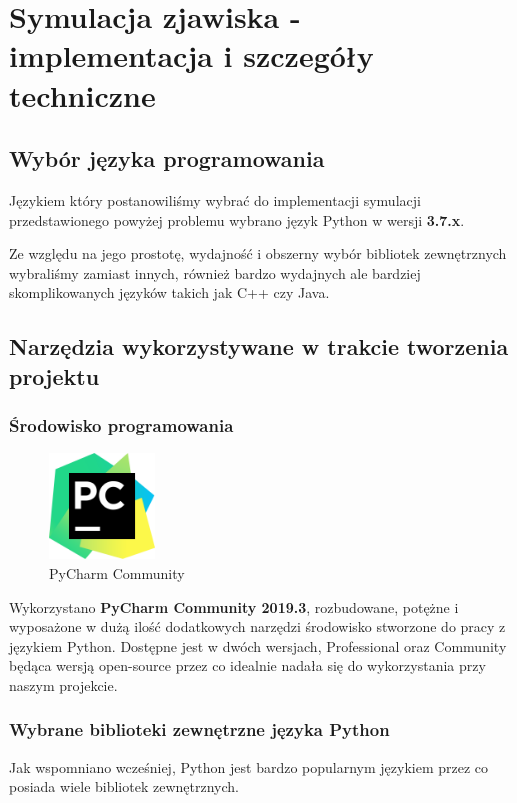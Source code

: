 \chapter{Symulacja zjawiska - implementacja i szczegóły techniczne}

\section{Wybór języka programowania}

Językiem który postanowiliśmy wybrać do implementacji symulacji przedstawionego powyżej problemu wybrano język Python w wersji \textbf{3.7.x}.

Ze względu na jego prostotę, wydajność i obszerny wybór bibliotek zewnętrznych wybraliśmy zamiast innych, również bardzo wydajnych ale bardziej skomplikowanych języków takich jak C++ czy Java.


\section{Narzędzia wykorzystywane w trakcie tworzenia projektu}
\begingroup
\subsection{Środowisko programowania}
\begin{figure}

	\centering
	\includegraphics[width=0.25\textwidth]{PyCharm_Logo.png}
	\caption{\label{fig:frog2}PyCharm Community}

\end{figure}

Wykorzystano \textbf{PyCharm Community 2019.3}, rozbudowane, potężne i wyposażone w dużą ilość dodatkowych narzędzi środowisko stworzone do pracy z językiem Python. Dostępne jest w dwóch wersjach, Professional oraz Community będąca wersją open-source przez co idealnie nadała się do wykorzystania przy naszym projekcie.

\endgroup
\clearpage

\subsection{Wybrane biblioteki zewnętrzne języka Python}
Jak wspomniano wcześniej, Python jest bardzo popularnym językiem przez co posiada wiele bibliotek zewnętrznych.

